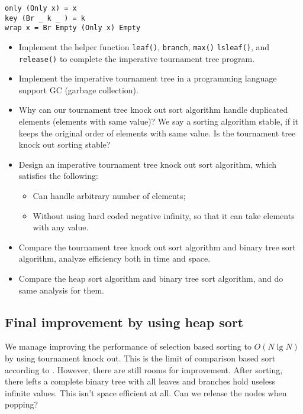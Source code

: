 \documentclass{article}
\begin{document}
\lstset{language=Haskell}
\begin{lstlisting}
only (Only x) = x
key (Br _ k _ ) = k
wrap x = Br Empty (Only x) Empty
\end{lstlisting}

\begin{Exercise}
  \begin{itemize}
    \item Implement the helper function \verb|leaf()|, \verb|branch|, \verb|max()| \verb|lsleaf()|, and \verb|release()| to complete the imperative tournament tree program.
    \item Implement the imperative tournament tree in a programming language support GC (garbage collection).
    \item Why can our tournament tree knock out sort algorithm handle duplicated elements (elements with same value)? We say a sorting algorithm stable, if it keeps the original order of elements with same value. Is the tournament tree knock out sorting stable?
    \item Design an imperative tournament tree knock out sort algorithm, which satisfies the following:
      \begin{itemize}
        \item Can handle arbitrary number of elements;
        \item Without using hard coded negative infinity, so that it can take elements with any value.
      \end{itemize}
    \item Compare the tournament tree knock out sort algorithm and binary tree sort algorithm, analyze efficiency both in time and space.
    \item Compare the heap sort algorithm and binary tree sort algorithm, and do same analysis for them.
  \end{itemize}
\end{Exercise}

\subsection{Final improvement by using heap sort}

We manage improving the performance of selection based sorting to $O(N \lg N)$ by using tournament knock out.
This is the limit of comparison based sort according to \cite{TAOCP}. However, there are still rooms for improvement.
After sorting, there lefts a complete binary tree with all leaves and branches hold useless infinite values.
This isn't space efficient at all. Can we release the nodes when popping?
\end{document}
